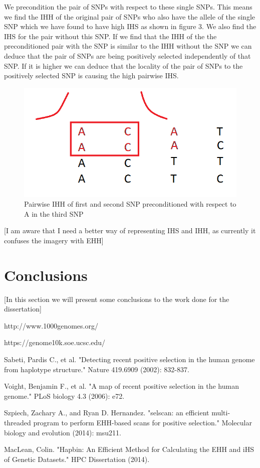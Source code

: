 \documentclass[a4paper,12pt]{report}
\begin{document}
\newpage
We precondition the pair of SNPs with respect to these single SNPs. This means we find the IHH of the original pair of SNPs who also have the allele of the single SNP which we have found to have high IHS as shown in figure 3. We also find the IHS for the pair without this SNP. If we find that the IHH of the the preconditioned pair with the SNP is similar to the IHH without the SNP we can deduce that the pair of SNPs are being positively selected independently of that SNP. If it is higher we can deduce that the locality of the pair of SNPs to the positively selected SNP is causing the high pairwise IHS.

\begin{figure}[h!]
  \centering
    \includegraphics[scale=0.5]{conditional4}
  \caption{Pairwise IHH of first and second SNP preconditioned  with respect to A in the third SNP}
\end{figure}

[I am aware that I need a better way of representing IHS and IHH, as currently it confuses the imagery with EHH]

\chapter{Conclusions}
[In this section we will present some conclusions to the work done for the dissertation]

\begin{thebibliography}{9}

http://www.1000genomes.org/

https://genome10k.soe.ucsc.edu/

Sabeti, Pardis C., et al. "Detecting recent positive selection in the human genome from haplotype structure." Nature 419.6909 (2002): 832-837.

Voight, Benjamin F., et al. "A map of recent positive selection in the human genome." PLoS biology 4.3 (2006): e72.


Szpiech, Zachary A., and Ryan D. Hernandez. "selscan: an efficient multi-threaded program to perform EHH-based scans for positive selection." Molecular biology and evolution (2014): msu211.


MacLean, Colin. "Hapbin: An Efficient Method for Calculating the EHH and iHS of Genetic Datasets." HPC Dissertation (2014).


\end{thebibliography}
\end{document}
